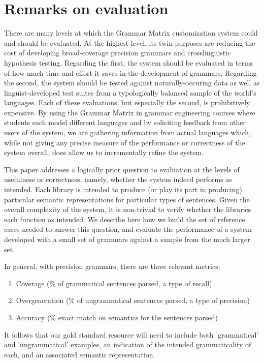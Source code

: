\documentclass[11pt]{article}
\begin{document}
\section{Remarks on evaluation}

There are many levels at which the Grammar Matrix customization system
could and should be evaluated. At the highest level, its twin purposes
are reducing the cost of developing broad-coverage precision grammars
and crosslinguistic hypothesis testing.  Regarding the first, the
system should be evaluated in terms of how much time and effort it
saves in the development of grammars.  Regarding the second, the
system should be tested against naturally-occuring data as well as
linguist-developed test suites from a typologically balanced sample of
the world's languages.  Each of these evaluations, but especially the
second, is prohibitively expensive.  By using the Grammar Matrix in
grammar engineering courses where students each model different
languages and by soliciting feedback from other users of the system,
we are gathering information from actual languages which, while not
giving any precise measure of the performance or correctness of the
system overall, does allow us to incrementally refine the system.

This paper addresses a logically prior question to evaluation at
the levels of usefulness or correctness, namely, whether the system
indeed performs as intended. Each library is intended to produce
(or play its part in producing) particular semantic representations for
particular types of sentences.  Given the overall complexity of the
system, it is non-trivial to verify whether the libraries each function
as intended.  We describe here how we build the set of reference cases
needed to answer this question, and evaluate the performance of
a system developed with a small set of grammars against a sample
from the much larger set.

In general, with precision grammars, there are three relevant
metrics:

\begin{enumerate}
\item Coverage (\% of grammatical sentences parsed, a type of recall)
\item Overgeneration (\% of ungrammatical sentences parsed, a type of precision)
\item Accuracy (\% exact match on semantics for the sentences parsed)
\end{enumerate}
%
It follows that our gold standard resource will need to include
both 'grammatical' and 'ungrammatical' examples, an indication of the
intended grammaticality of each, and an associated semantic representation.
\end{document}
